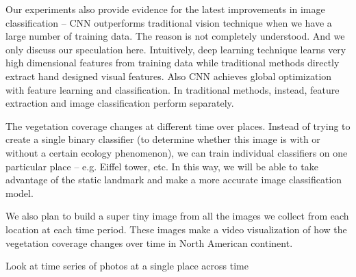 
Our experiments also provide evidence for the latest improvements in image classification -- CNN outperforms traditional vision technique when
 we have a large number of training data. The reason is not completely understood. And we only 
discuss our speculation here.
Intuitively, deep learning technique learns very high dimensional features from training data
while traditional methods directly extract hand designed visual features. Also CNN achieves 
global optimization with feature
learning and classification. In traditional methods, instead, feature extraction and image
classification perform separately.




The vegetation coverage changes at different time over places. 
Instead of trying to create a single binary classifier (to determine whether this image is with or
without a certain ecology phenomenon),
we can train individual classifiers on one particular place 
-- e.g. Eiffel tower, etc. 
In this way, we will be able to 
take advantage of the static landmark and make a more accurate image classification model.


We also plan to build a super tiny image from all the images we collect from each location at each time period. 
These images make a video visualization of how the vegetation coverage changes over time in North American continent.

Look at time series of photos at a single place across time 

